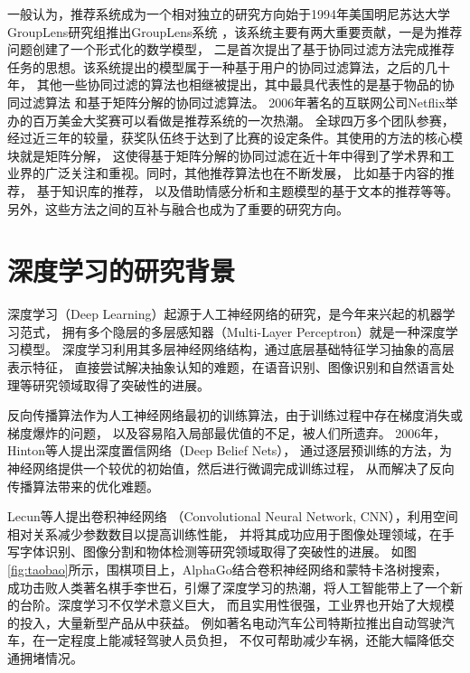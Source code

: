 一般认为，推荐系统成为一个相对独立的研究方向始于1994年美国明尼苏达大学GroupLens研究组推出GroupLens系统
\parencite{resnick1994grouplens}，该系统主要有两大重要贡献，一是为推荐问题创建了一个形式化的数学模型，
二是首次提出了基于协同过滤方法完成推荐任务的思想。该系统提出的模型属于一种基于用户的协同过滤算法，之后的几十年，
其他一些协同过滤的算法也相继被提出，其中最具代表性的是基于物品的协同过滤算法\parencite{sarwar2001item}
和基于矩阵分解的协同过滤算法\parencite{koren2009matrix}。
2006年著名的互联网公司Netflix举办的百万美金大奖赛\parencite{bennett2007netflix}可以看做是推荐系统的一次热潮。
全球四万多个团队参赛，经过近三年的较量，获奖队伍终于达到了比赛的设定条件。其使用的方法的核心模块就是矩阵分解，
这使得基于矩阵分解的协同过滤在近十年中得到了学术界和工业界的广泛关注和重视。同时，其他推荐算法也在不断发展，
比如基于内容的推荐\parencite{ricci2011introduction,pazzani2007content}，
基于知识库的推荐\parencite{trewin2000knowledge}，
以及借助情感分析\parencite{ganu2009beyond}和主题模型\parencite{wang2011collaborative}的基于文本的推荐等等。
另外，这些方法之间的互补与融合也成为了重要的研究方向\parencite{burke2002hybrid}。

\section{深度学习的研究背景}
深度学习（Deep Learning）起源于人工神经网络的研究，是今年来兴起的机器学习范式，
拥有多个隐层的多层感知器（Multi-Layer Perceptron）就是一种深度学习模型。
深度学习利用其多层神经网络结构，通过底层基础特征学习抽象的高层表示特征，
直接尝试解决抽象认知的难题，在语音识别、图像识别和自然语言处理等研究领域取得了突破性的进展。

反向传播算法作为人工神经网络最初的训练算法，由于训练过程中存在梯度消失或梯度爆炸的问题，
以及容易陷入局部最优值的不足，被人们所遗弃。
2006年，Hinton等人\parencite{hinton2006fast}提出深度置信网络（Deep Belief Nets），
通过逐层预训练的方法，为神经网络提供一个较优的初始值，然后进行微调完成训练过程，
从而解决了反向传播算法带来的优化难题。

Lecun等人\parencite{lecun1989backpropagation}提出卷积神经网络
（Convolutional Neural Network, CNN），利用空间相对关系减少参数数目以提高训练性能，
并将其成功应用于图像处理领域，在手写字体识别、图像分割和物体检测等研究领域取得了突破性的进展。
如图\ref{fig:taobao}所示，围棋项目上，AlphaGo\parencite{silver2016mastering}结合卷积神经网络和蒙特卡洛树搜索，
成功击败人类著名棋手李世石，引爆了深度学习的热潮，将人工智能带上了一个新的台阶。深度学习不仅学术意义巨大，
而且实用性很强，工业界也开始了大规模的投入，大量新型产品从中获益。
例如著名电动汽车公司特斯拉推出自动驾驶汽车\parencite{bengio2009learning}，在一定程度上能减轻驾驶人员负担，
不仅可帮助减少车祸，还能大幅降低交通拥堵情况。

